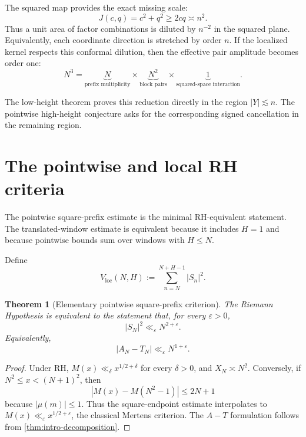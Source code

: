\documentclass[11pt]{article}
\newtheorem{theorem}{Theorem}[section]
\theoremstyle{definition}
\newcommand{\eps}{\varepsilon}
\newcommand{\1}{\mathbf{1}}
\begin{document}
The squared map provides the exact missing scale:
\begin{equation}
 J(c,q)=c^2+q^2\ge2cq\asymp n^2.
 \label{eq:two-power-J}
\end{equation}
Thus a unit area of factor combinations is diluted by $n^{-2}$ in the squared plane.  Equivalently, each coordinate direction is stretched by order $n$.  If the localized kernel respects this conformal dilution, then the effective pair amplitude becomes order one:
\begin{equation}
 N^3
 =
 \underbrace{N}_{\text{prefix multiplicity}}
 \times
 \underbrace{N^2}_{\text{block pairs}}
 \times
 \underbrace{1}_{\text{squared-space interaction}}.
 \label{eq:N3-accounting}
\end{equation}

The low-height theorem proves this reduction directly in the region $|Y|\lesssim n$.  The pointwise high-height conjecture asks for the corresponding signed cancellation in the remaining region.

\section{The pointwise and local RH criteria}
\label{sec:local-criterion}

The pointwise square-prefix estimate is the minimal RH-equivalent statement.  The translated-window estimate is equivalent because it includes $H=1$ and because pointwise bounds sum over windows with $H\le N$.

Define
\begin{equation}
 V_{\mathrm{loc}}(N,H)
 :=\sum_{n=N}^{N+H-1}|S_n|^2.
 \label{eq:Vloc}
\end{equation}

\begin{theorem}[Elementary pointwise square-prefix criterion]
\label{thm:pointwise-square-prefix-RH}
The Riemann Hypothesis is equivalent to the statement that, for every $\eps>0$,
\begin{equation}
 \boxed{|S_N|^2\ll_\eps N^{2+\eps}.}
 \label{eq:pointwise-square-prefix-RH}
\end{equation}
Equivalently,
\begin{equation}
 |A_N-T_N|\ll_\eps N^{1+\eps}.
 \label{eq:pointwise-AT-RH-again}
\end{equation}
\end{theorem}

\begin{proof}
Under RH, $M(x)\ll_\delta x^{1/2+\delta}$ for every $\delta>0$, and $X_N\asymp N^2$.  Conversely, if $N^2\le x<(N+1)^2$, then
\[
 |M(x)-M(N^2-1)|\le2N+1
\]
because $|\mu(m)|\le1$.  Thus the square-endpoint estimate interpolates to $M(x)\ll_\eps x^{1/2+\eps}$, the classical Mertens criterion.  The $A-T$ formulation follows from \cref{thm:intro-decomposition}.
\end{proof}
\end{document}
